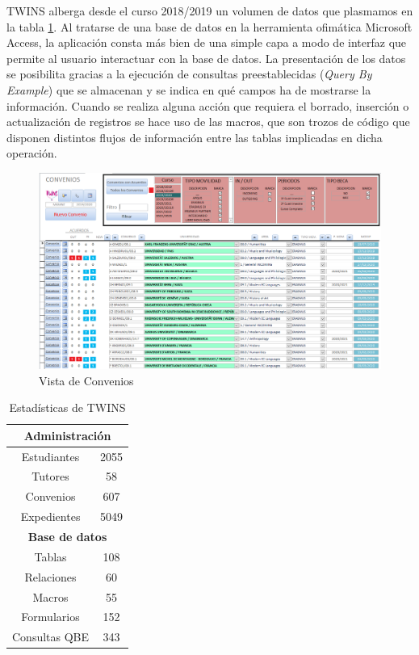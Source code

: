 TWINS alberga desde el curso 2018/2019 un volumen de datos que plasmamos en la tabla \ref{tab:estadisticasTWINS}. Al tratarse de una base de datos en la herramienta ofimática Microsoft Access\textregistered, la aplicación consta más bien de una simple capa a modo de interfaz que permite al usuario interactuar con la base de datos. La presentación de los datos se posibilita gracias a la ejecución de consultas preestablecidas (\textit{Query By Example}) que se almacenan y se indica en qué campos ha de mostrarse la información. Cuando se realiza alguna acción que requiera el borrado, inserción o actualización de registros se hace uso de las macros, que son trozos de código que disponen distintos flujos de información entre las tablas implicadas en dicha operación.

\begin{figure}
	\includegraphics[width=\textwidth]{img/Capturas de TWINS/vistaConvenios.png}
	\caption[Convenios]{Vista de Convenios}
	\label{fig:vistaConvenios}
\end{figure}

\begin{table}[h]
	\begin{center}
		\begin{tabular}{ | c | c | } 
			\hline
			\multicolumn{2}{|c|}{\textbf{Administración}} \\
			\hline
			Estudiantes \footnotemark & 2055 \\ 
			\hline
			Tutores & 58 \\
			\hline
			Convenios  & 607 \\ 
			\hline
			Expedientes & 5049 \\ 
			\hline
			\multicolumn{2}{|c|}{\textbf{Base de datos}} \\
			\hline
			Tablas & 108 \\
			\hline
			Relaciones & 60 \\
			\hline
			Macros & 55 \\
			\hline
			Formularios & 152 \\
			\hline
			Consultas QBE & 343 \\
			\hline
		\end{tabular}
		\caption{Estadísticas de TWINS}
		\label{tab:estadisticasTWINS}
	\end{center}
\end{table}~



